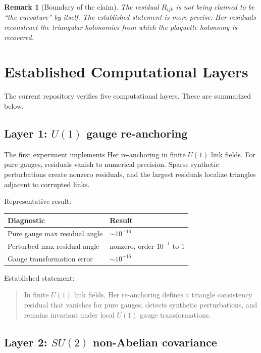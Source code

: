 \documentclass[11pt]{article}
\newtheorem{remark}{Remark}
\newcommand{\Uone}{U(1)}
\newcommand{\Sutwo}{SU(2)}
\newcommand{\Rijk}{R_{ijk}}
\begin{document}
\begin{remark}[Boundary of the claim]
The residual \(\Rijk\) is not being claimed to be ``the curvature'' by itself.  The established statement is more precise: Her residuals reconstruct the triangular holonomies from which the plaquette holonomy is recovered.
\end{remark}

\section{Established Computational Layers}

The current repository verifies five computational layers.  These are summarized below.

\subsection{Layer 1: \(\Uone\) gauge re-anchoring}

The first experiment implements Her re-anchoring in finite \(\Uone\) link fields.  For pure gauges, residuals vanish to numerical precision.  Sparse synthetic perturbations create nonzero residuals, and the largest residuals localize triangles adjacent to corrupted links.

Representative result:
\begin{center}
\begin{tabular}{ll}
\toprule
Diagnostic & Result \\
\midrule
Pure gauge max residual angle & \(\sim 10^{-16}\) \\
Perturbed max residual angle & nonzero, order \(10^{-1}\) to \(1\) \\
Gauge transformation error & \(\sim 10^{-16}\) \\
\bottomrule
\end{tabular}
\end{center}

Established statement:
\begin{quote}
In finite \(\Uone\) link fields, Her re-anchoring defines a triangle consistency residual that vanishes for pure gauges, detects synthetic perturbations, and remains invariant under local \(\Uone\) gauge transformations.
\end{quote}

\subsection{Layer 2: \(\Sutwo\) non-Abelian covariance}
\end{document}

